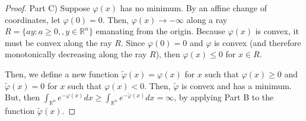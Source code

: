 \documentclass[10pt,a4paper]{amsart}
\begin{document}
\begin{proof}

Part C) Suppose $\varphi(x)$ has no minimum. By an affine change of coordinates, let $\varphi(0) = 0$. Then, $\varphi(x) \rightarrow -\infty$ along a ray $R = \{ay: a\geq 0, ,y \in \mathbb{R}^n\}$ emanating from the origin. Because $\varphi(x)$ is convex, it must be convex along the ray $R$. Since $\varphi(0) = 0$ and $\varphi$ is convex (and therefore monotonically decreasing along the ray $R$), then $\varphi(x) \leq 0$ for $x \in R$.

Then, we define a new function $\tilde{\varphi}(x) = \varphi(x)$ for $x$ such that $\varphi(x) \geq 0$ and $\tilde{\varphi}(x) = 0$ for $x$ such that $\varphi(x) < 0$. Then, $\tilde{\varphi}$ is convex and has a minimum. But, then $\int_{\mathbb{R}^n} e^{-\varphi(x)}dx \geq \int_{\mathbb{R}^n} e^{-\tilde{\varphi}(x)}dx = \infty$, by applying Part B to the function $\tilde{\varphi}(x)$.


\end{proof}
\end{document}
